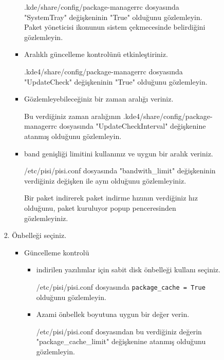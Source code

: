 \documentclass[a4paper,10pt]{article}
\begin{document}
\begin{enumerate}
\begin{enumerate}
\begin{enumerate}
\begin{enumerate}
\begin{itemize}
                    .kde/share/config/package-managerrc dosyasında "SystemTray" değişkeninin "True" olduğunu gözlemleyin.
		     Paket yöneticisi ikonunun sistem çekmecesinde belirdiğini gözlemleyin.

                    \item Aralıklı güncelleme kontrolünü etkinleştiriniz. 
                 
                        .kde4/share/config/package-managerrc dosyasında "UpdateCheck" değişkeninin "True" olduğunu gözlemleyin.
                        
		    \item Gözlemleyebileceğiniz bir zaman aralığı veriniz. 
	
			 Bu verdiğiniz zaman aralığının .kde4/share/config/package-managerrc dosyasında "UpdateCheckInterval" değişkenine atanmış olduğunu gözlemleyin.    

                    \item band genişliği limitini kullanınız ve uygun bir aralık veriniz.

		     /etc/pisi/pisi.conf dosyasında "bandwith\_limit" değişkeninin verdiğiniz değişken ile aynı olduğunu gözlemleyiniz.

                     Bir paket indirerek paket indirme hızının verdiğiniz hız olduğunu, paket kuruluyor popup penceresinden gözlemleyiniz.
    
                \end{itemize}
                \item Önbelleği seçiniz.
                \begin{itemize}
                    \item Güncelleme kontrolü 
                    \begin{itemize}
                        \item indirilen yazılımlar için sabit disk önbelleği kullanı seçiniz.

                        /etc/pisi/pisi.conf dosyasında \texttt{package\_cache = True} olduğunu gözlemleyin.

                        \item Azami önbellek boyutuna uygun bir değer verin.

                        /etc/pisi/pisi.conf dosyasından bu verdiğiniz değerin "package\_cache\_limit" değişkenine atanmış olduğunu gözlemleyin.
                    \end{itemize}
                  

\end{itemize}
\end{enumerate}
\end{enumerate}
\end{enumerate}
\end{enumerate}
\end{document}
